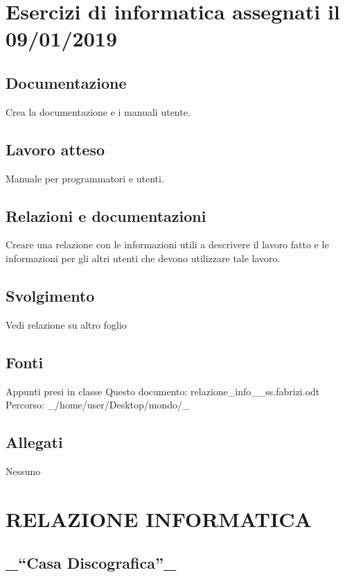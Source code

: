\section*{Esercizi di informatica assegnati il 09/01/2019}

\subsection*{Documentazione}

Crea la documentazione e i manuali utente. \subsection*{Lavoro atteso}

Manuale per programmatori e utenti. \subsection*{Relazioni e documentazioni}

Creare una relazione con le informazioni utili a descrivere il lavoro fatto e le informazioni per gli altri utenti che devono utilizzare tale lavoro. \subsection*{Svolgimento}

Vedi relazione su altro foglio \subsection*{Fonti}

Appunti presi in classe Questo documento\+: relazione\+\_\+info\+\_\+\_\+ss.\+fabrizi.\+odt Percorso\+: \+\_\+/home/user/\+Desktop/mondo/\+\_\+ \subsection*{Allegati}

Nessuno

\section*{R\+E\+L\+A\+Z\+I\+O\+NE I\+N\+F\+O\+R\+M\+A\+T\+I\+CA}

\subsection*{\+\_\+“\+Casa Discografica”\+\_\+}

